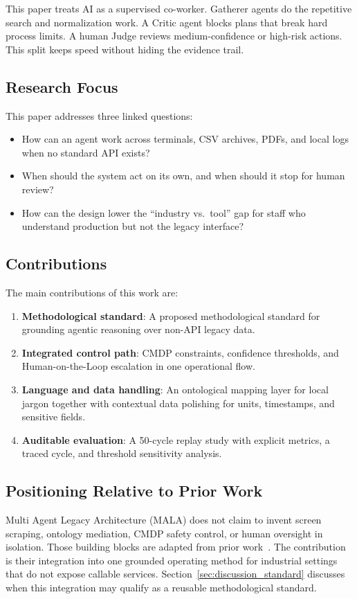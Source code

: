 \documentclass[conference]{IEEEtran}
\newcommand{\MALA}{Multi Agent Legacy Architecture (MALA)}
\begin{document}
This paper treats AI as a supervised co-worker. Gatherer agents do the repetitive search and normalization work. A Critic agent blocks plans that break hard process limits. A human Judge reviews medium-confidence or high-risk actions. This split keeps speed without hiding the evidence trail.

\subsection{Research Focus}
This paper addresses three linked questions:
\begin{itemize}
  \item How can an agent work across terminals, CSV archives, PDFs, and local logs when no standard API exists?
  \item When should the system act on its own, and when should it stop for human review?
  \item How can the design lower the ``industry vs.~tool'' gap for staff who understand production but not the legacy interface?
\end{itemize}

\subsection{Contributions}
The main contributions of this work are:
\begin{enumerate}
  \item \textbf{Methodological standard}: A proposed methodological standard for grounding agentic reasoning over non-API legacy data.
  \item \textbf{Integrated control path}: CMDP constraints, confidence thresholds, and Human-on-the-Loop escalation in one operational flow.
  \item \textbf{Language and data handling}: An ontological mapping layer for local jargon together with contextual data polishing for units, timestamps, and sensitive fields.
  \item \textbf{Auditable evaluation}: A 50-cycle replay study with explicit metrics, a traced cycle, and threshold sensitivity analysis.
\end{enumerate}

\subsection{Positioning Relative to Prior Work}

\MALA{} does not claim to invent screen scraping, ontology mediation, CMDP safety control, or human oversight in isolation. Those building blocks are adapted from prior work~\cite{comella2000,fogliatto2020,achiam2017,yang2023,ribeiro2019}. The contribution is their integration into one grounded operating method for industrial settings that do not expose callable services. Section~\ref{sec:discussion_standard} discusses when this integration may qualify as a reusable methodological standard.
\end{document}
